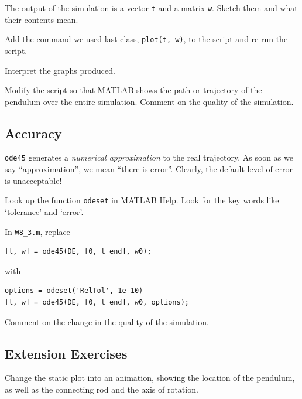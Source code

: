 \vsc

\newpage

\problem The output of the simulation is a vector \texttt{t} and a
  matrix \texttt{w}.  Sketch them and what their contents mean.

\vfill

\newpage

\problem Add the command we used last class, \texttt{plot(t, w)}, 
to the script and re-run the script. 

\vsc

\problem Interpret the graphs produced.

\vfill

\problem Modify the script so that MATLAB shows the path or
  trajectory of the pendulum over the entire simulation.  Comment on
  the quality of the simulation.

\vfill

\newpage


\newpage

\subsection*{Accuracy}
\verb#ode45# generates a {\em numerical approximation} to the real
trajectory.  As soon as we say ``approximation'', we mean ``there is
error''.  Clearly, the default level of error is unacceptable!

\problem Look up the function \texttt{odeset} in MATLAB Help.  Look
  for the key words like `tolerance' and `error'.

\vsc

\problem In \texttt{W8\_3.m}, replace 
\begin{verbatim}
[t, w] = ode45(DE, [0, t_end], w0);
\end{verbatim}
with
\begin{verbatim}
options = odeset('RelTol', 1e-10)
[t, w] = ode45(DE, [0, t_end], w0, options);
\end{verbatim}

\problem Comment on the change in the quality of the simulation.

\vfill

\newpage

\subsection*{Extension Exercises}

\problem Change the static plot into an animation, showing the
  location of the pendulum, as well as the connecting rod and the axis
  of rotation.


